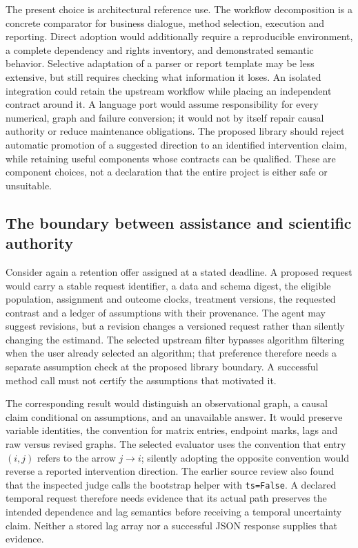 The present choice is architectural reference use. The workflow decomposition
is a concrete comparator for business dialogue, method selection, execution
and reporting. Direct adoption would additionally require a reproducible
environment, a complete dependency and rights inventory, and demonstrated
semantic behavior. Selective adaptation of a parser or report template may be
less extensive, but still requires checking what information it loses. An
isolated integration could retain the upstream workflow while placing an
independent contract around it. A language port would assume responsibility
for every numerical, graph and failure conversion; it would not by itself
repair causal authority or reduce maintenance obligations. The proposed
library should reject automatic promotion of a suggested direction to an
identified intervention claim, while retaining useful components whose
contracts can be qualified. These are component choices, not a declaration
that the entire project is either safe or unsuitable.
\citep{exec17_copilot_code,exec25_copilot_choice}

\subsection{The boundary between assistance and scientific authority}

Consider again a retention offer assigned at a stated deadline. A proposed
request would carry a stable request identifier, a data and schema digest,
the eligible population, assignment and outcome clocks, treatment versions,
the requested contrast and a ledger of assumptions with their provenance.
The agent may suggest revisions, but a revision changes a versioned request
rather than silently changing the estimand. The selected upstream filter
bypasses algorithm filtering when the user already selected an algorithm;
that preference therefore needs a separate assumption check at the proposed
library boundary. A successful method call must not certify the assumptions
that motivated it.~\citep{exec17_copilot_code}

The corresponding result would distinguish an observational graph, a causal
claim conditional on assumptions, and an unavailable answer. It would preserve
variable identities, the convention for matrix entries, endpoint marks, lags
and raw versus revised graphs. The selected evaluator uses the convention
that entry $(i,j)$ refers to the arrow $j\to i$; silently adopting the
opposite convention would reverse a reported intervention direction. The
earlier source review also found that the inspected judge calls the bootstrap
helper with \texttt{ts=False}. A declared temporal request therefore needs
evidence that its actual path preserves the intended dependence and lag
semantics before receiving a temporal uncertainty claim. Neither a stored
lag array nor a successful JSON response supplies that evidence.
\citep{exec17_copilot_code}

